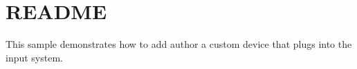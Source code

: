 \chapter{README}
\hypertarget{md__hey_tea_9_2_library_2_package_cache_2com_8unity_8inputsystem_0d1_86_83_2_samples_0i_2_custom_device_2_r_e_a_d_m_e}{}\label{md__hey_tea_9_2_library_2_package_cache_2com_8unity_8inputsystem_0d1_86_83_2_samples_0i_2_custom_device_2_r_e_a_d_m_e}
This sample demonstrates how to add author a custom device that plugs into the input system. 